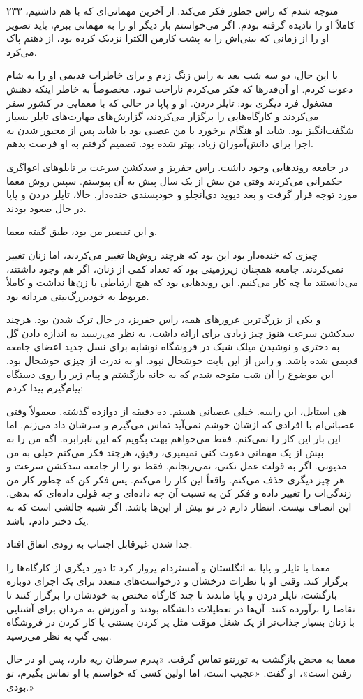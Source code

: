 ۲۳۳  
متوجه شدم که راس چطور فکر می‌کند. از آخرین مهمانی‌ای که با هم داشتیم، کاملاً او را نادیده گرفته بودم. اگر می‌خواستم بار دیگر او را به مهمانی ببرم، باید تصویر او را از زمانی که بینی‌اش را به پشت کارمن الکترا نزدیک کرده بود، از ذهنم پاک می‌کرد.

با این حال، دو سه شب بعد به راس زنگ زدم و برای خاطرات قدیمی او را به شام دعوت کردم. او آن‌قدرها که فکر می‌کردم ناراحت نبود، مخصوصاً به خاطر اینکه ذهنش مشغول فرد دیگری بود: تایلر دردن.  
او و پاپا در حالی که با معمایی در کشور سفر می‌کردند و کارگاه‌هایی را برگزار می‌کردند، گزارش‌های مهارت‌های تایلر بسیار شگفت‌انگیز بود. شاید او هنگام برخورد با من عصبی بود یا شاید پس از مجبور شدن به اجرا برای دانش‌آموزان زیاد، بهتر شده بود. تصمیم گرفتم به او فرصت بدهم.

در جامعه روندهایی وجود داشت. راس جفریز و سدکشن سرعت بر تابلوهای اغواگری حکمرانی می‌کردند وقتی من بیش از یک سال پیش به آن پیوستم. سپس روش معما مورد توجه قرار گرفت و بعد دیوید دی‌آنجلو و خودپسندی خنده‌دار. حالا، تایلر دردن و پاپا در حال صعود بودند.

و این تقصیر من بود، طبق گفته معما.

چیزی که خنده‌دار بود این بود که هرچند روش‌ها تغییر می‌کردند، اما زنان تغییر نمی‌کردند. جامعه همچنان زیرزمینی بود که تعداد کمی از زنان، اگر هم وجود داشتند، می‌دانستند ما چه کار می‌کنیم. این روندهایی بود که هیچ ارتباطی با زن‌ها نداشت و کاملاً مربوط به خودبزرگ‌بینی مردانه بود.

و یکی از بزرگ‌ترین غرورهای همه، راس جفریز، در حال ترک شدن بود. هرچند سدکشن سرعت هنوز چیز زیادی برای ارائه داشت، به نظر می‌رسید به اندازه دادن گل به دختری و نوشیدن میلک شیک در فروشگاه نوشابه برای نسل جدید اعضای جامعه قدیمی شده باشد. و راس از این بابت خوشحال نبود. او به ندرت از چیزی خوشحال بود. این موضوع را آن شب متوجه شدم که به خانه بازگشتم و پیام زیر را روی دستگاه پیام‌گیرم پیدا کردم:

هی استایل، این راسه. خیلی عصبانی هستم. ده دقیقه از دوازده گذشته. معمولاً وقتی عصبانی‌ام با افرادی که ازشان خوشم نمی‌آید تماس می‌گیرم و سرشان داد می‌زنم. اما این بار این کار را نمی‌کنم. فقط می‌خواهم بهت بگویم که این نابرابره. اگه من را به بیش از یک مهمانی دعوت کنی نمیمیری، رفیق، هرچند فکر می‌کنم خیلی به من مدیونی.  
اگر به قولت عمل نکنی، نمی‌رنجانم. فقط تو را از جامعه سدکشن سرعت و هر چیز دیگری حذف می‌کنم. واقعاً این کار را می‌کنم. پس فکر کن که چطور کار من زندگی‌ات را تغییر داده و فکر کن به نسبت آن چه داده‌ای و چه قولی داده‌ای که بدهی. این انصاف نیست. انتظار دارم در تو بیش از این‌ها باشد. اگر شبیه چالشی است که به یک دختر دادم، باشد.

جدا شدن غیرقابل اجتناب به زودی اتفاق افتاد.

معما با تایلر و پاپا به انگلستان و آمستردام پرواز کرد تا دور دیگری از کارگاه‌ها را برگزار کند. وقتی او با نظرات درخشان و درخواست‌های متعدد برای یک اجرای دوباره بازگشت، تایلر دردن و پاپا ماندند تا چند کارگاه مختص به خودشان را برگزار کنند تا تقاضا را برآورده کنند. آن‌ها در تعطیلات دانشگاه بودند و آموزش به مردان برای آشنایی با زنان بسیار جذاب‌تر از یک شغل موقت مثل پر کردن بستنی یا کار کردن در فروشگاه بیبی گپ به نظر می‌رسید.

معما به محض بازگشت به تورنتو تماس گرفت. «پدرم سرطان ریه دارد، پس او در حال رفتن است»، او گفت. «عجیب است، اما اولین کسی که خواستم با او تماس بگیرم، تو بودی.»